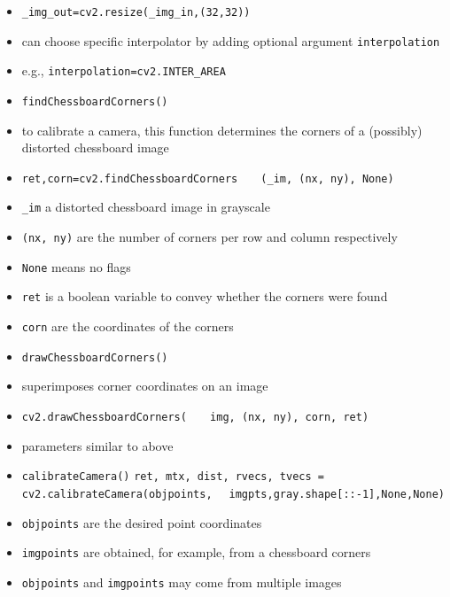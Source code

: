 \documentclass[onecolumn]{IEEEtran} %
\begin{document}
\begin{itemize}
        \item \verb|_img_out=cv2.resize(_img_in,(32,32))|
        \item can choose specific interpolator by adding optional argument \verb|interpolation|
        \bi
            \item e.g., \verb|interpolation=cv2.INTER_AREA|
        \ei
    \ei
     \item \verb|findChessboardCorners()|
    \bi
        \item to calibrate a camera, this function determines the corners of a (possibly) distorted chessboard image
        \item \verb|ret,corn=cv2.findChessboardCorners|
            \newline \verb|   (_im, (nx, ny), None)|
        \bi
            \item \verb|_im|  a distorted chessboard image in grayscale
            \item \verb|(nx, ny)|  are the number of corners per row and column respectively
            \item \verb|None| means no flags
            \item \verb|ret| is a boolean variable to convey whether the corners were found
            \item \verb|corn| are the coordinates of the corners
        \ei
    \ei
    \item \verb|drawChessboardCorners()|
    \bi
        \item superimposes corner coordinates on an image
        \item \verb|cv2.drawChessboardCorners(| \newline
                    \verb|   img, (nx, ny), corn, ret)|
        \item parameters similar to above
    \ei
    \item \verb|calibrateCamera()| \newline
    \verb|ret, mtx, dist, rvecs, tvecs = | \newline
        \verb|  cv2.calibrateCamera(objpoints,| \newline
            \verb|  imgpts,gray.shape[::-1],None,None)|
    \bi
        \item \verb|objpoints| are the desired point coordinates
        \item \verb|imgpoints| are obtained, for example, from a chessboard corners
        \bi
            \item \verb|objpoints| and \verb|imgpoints| may come from multiple images

\end{itemize}
\end{document}

